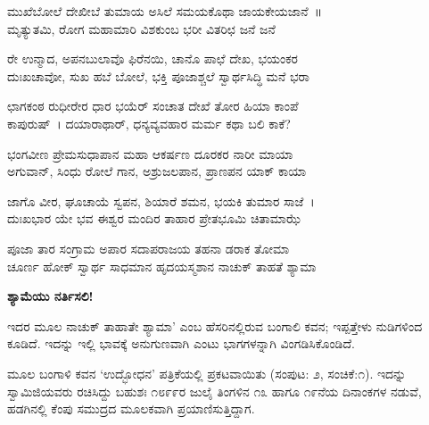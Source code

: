 
\begin{myquote}
ಮುಖೆಬೋಲೆ ದೇಖೀಬೆ ತುಮಾಯ ಅಸಿಲೆ ಸಮಯಕೊಥಾ ಜಾಯಕೇಯಜಾನೆ~॥\\ಮೃತ್ಯುತಮಿ, ರೋಗ ಮಹಾಮಾರಿ ವಿಶಕುಂಬ ಭರೀ ವಿತರಿಛ ಜನೆ ಜನೆ
\end{myquote}


\begin{myquote}
ರೇ ಉನ್ಮಾದ, ಅಪನಬುಲಾವೊ ಫಿರೆನಯಿ, ಚಾನೊ ಪಾಛೆ ದೇಖ, ಭಯಂಕರ\\ದುಃಖಚಾವೋ, ಸುಖ ಹಬೆ ಬೋಲೆ, ಭಕ್ತಿ ಪೂಜಾಶ್ಚಲೆ ಸ್ವಾರ್ಥಸಿದ್ಧಿ ಮನೆ ಭರಾ
\end{myquote}


\begin{myquote}
ಛಾಗಕಂಠ ರುಧೀರೇರ ಧಾರ ಭಯೆರ್ ಸಂಚಾತ ದೇಖೆ ತೋರ ಹಿಯಾ ಕಾಂಪೆ\\ಕಾಪುರುಷ್~। ದಯಾರಾಥಾರ್, ಧನ್ಯವ್ಯವಹಾರ ಮರ್ಮ ಕಥಾ ಬಲಿ ಕಾಕೆ?
\end{myquote}


\begin{myquote}
ಭಂಗವೀಣ ಪ್ರೇಮಸುಧಾಪಾನ ಮಹಾ ಆಕರ್ಷಣ ದೂರಕರ ನಾರೀ ಮಾಯಾ\\ಅಗುವಾನ್, ಸಿಂಧು ರೋಲೆ ಗಾನ, ಅಶ್ರುಜಲಪಾನ, ಪ್ರಾಣಪನ ಯಾಕ್ ಕಾಯಾ
\end{myquote}


\begin{myquote}
ಜಾಗೊ ವೀರ, ಘೂಚಾಯೆ ಸ್ವಪನ, ಶಿಯಾರೆ ಶಮನ, ಭಯಕಿ ತುಮಾರ ಸಾಜೆ~।\\ದುಃಖಭಾರ ಯೇ ಭವ ಈಶ್ವರ ಮಂದಿರ ತಾಹಾರ ಪ್ರೇತಭೂಮಿ ಚಿತಾಮಾಝೆ
\end{myquote}


\begin{myquote}
ಪೂಜಾ ತಾರ ಸಂಗ್ರಾಮ ಅಪಾರ ಸದಾಪರಾಜಯ ತಹನಾ ಡರಾಕ ತೋಮಾ\\ಚೂರ್ಣ ಹೋಕ್ ಸ್ವಾರ್ಥ ಸಾಧಮಾನ ಹೃದಯಸ್ಮಶಾನ ನಾಚುಕ್ ತಾಹತೆ ಶ್ಯಾಮಾ
\end{myquote}


\begin{center}
\textbf{ಶ್ಯಾಮೆಯು ನರ್ತಿಸಲಿ!}
\end{center}

ಇದರ ಮೂಲ ನಾಚುಕ್ ತಾಹಾತೇ ಶ್ಯಾಮಾ' ಎಂಬ ಹೆಸರಿನಲ್ಲಿರುವ ಬಂಗಾಲಿ ಕವನ; ಇಪ್ಪತ್ತೇಳು ನುಡಿಗಳಿಂದ ಕೂಡಿದೆ. ಇದನ್ನು ಇಲ್ಲಿ ಭಾವಕ್ಕೆ ಅನುಗುಣವಾಗಿ ಎಂಟು ಭಾಗಗಳನ್ನಾಗಿ ವಿಂಗಡಿಸಿಕೊಂಡಿದೆ.

ಮೂಲ ಬಂಗಾಳಿ ಕವನ ‘ಉದ್ಭೋಧನ’ ಪತ್ರಿಕೆಯಲ್ಲಿ ಪ್ರಕಟವಾಯಿತು (ಸಂಪುಟ: ೨, ಸಂಚಿಕೆ:೧). ಇದನ್ನು ಸ್ವಾಮಿಜಿಯವರು ರಚಿಸಿದ್ದು ಬಹುಶಃ ೧೮೯೯ರ ಜುಲೈ ತಿಂಗಳಿನ ೧೩ ಹಾಗೂ ೧೯ನೆಯ ದಿನಾಂಕಗಳ ನಡುವೆ, ಹಡಗಿನಲ್ಲಿ ಕೆಂಪು ಸಮುದ್ರದ ಮೂಲಕವಾಗಿ ಪ್ರಯಾಣಿಸುತ್ತಿದ್ದಾಗ.


